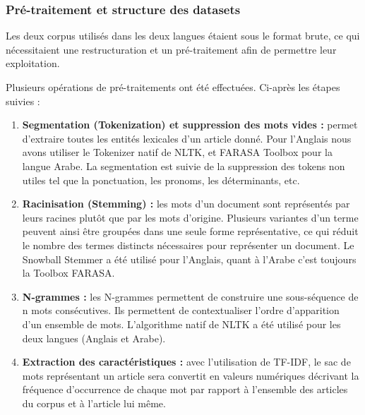         \subsubsection{Pré-traitement et structure des datasets}
            Les deux corpus utilisés dans les deux langues étaient sous le format brute, ce qui nécessitaient une restructuration et un pré-traitement afin de permettre leur exploitation.  

            Plusieurs opérations de pré-traitements ont été effectuées. Ci-après les étapes suivies :
            \begin{enumerate}
                \item{\textbf{Segmentation (Tokenization) et suppression des mots vides :} }permet d'extraire toutes les entités lexicales d'un article donné. Pour l'Anglais nous avons utiliser le Tokenizer natif de NLTK, et FARASA Toolbox pour la langue Arabe. La segmentation est suivie de la suppression des tokens non utiles tel que la ponctuation, les pronoms, les déterminants, etc.\\  
                
                \item{\textbf{Racinisation (Stemming) :} }les mots d'un document sont représentés par leurs racines plutôt que par les mots d'origine. Plusieurs variantes d'un terme peuvent ainsi être groupées dans une seule forme représentative, ce qui réduit le nombre des termes distincts nécessaires pour représenter un document. Le Snowball Stemmer a été utilisé pour l'Anglais, quant à l'Arabe c'est toujours la Toolbox FARASA.\\

                \item{\textbf{N-grammes :} }les N-grammes permettent de construire une sous-séquence de n mots consécutives. Ils permettent de contextualiser l'ordre d'apparition d'un ensemble de mots. L'algorithme natif de NLTK a été utilisé pour les deux langues (Anglais et Arabe).\\ 
                
                \item{\textbf{Extraction des caractéristiques :} }avec l'utilisation de TF-IDF, le sac de mots représentant un article sera convertit en valeurs numériques décrivant la fréquence d'occurrence de chaque mot par rapport à l'ensemble des articles du corpus et à l'article lui même.\\
            \end{enumerate}

